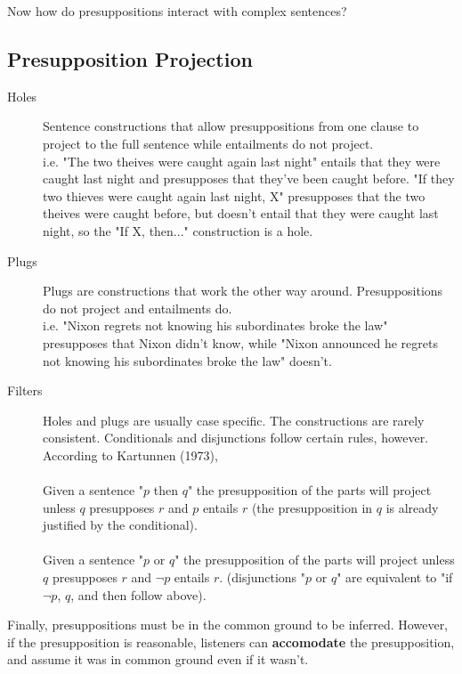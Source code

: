 \documentclass[11pt]{article}
\begin{document}
Now how do presuppositions interact with complex sentences?
\subsection{Presupposition Projection}
\begin{description}
    \item[Holes] Sentence constructions that allow presuppositions from one clause to project to the full
        sentence while entailments do not project. \\
        i.e. "The two theives were caught again last night" entails that they were caught last night and 
        presupposes that they've been caught before. "If they two thieves were caught again last night, X"
        presupposes that the two theives were caught before, but doesn't entail that they were caught 
        last night, so the "If X, then..." construction is a hole.
    \item[Plugs] Plugs are constructions that work the other way around. Presuppositions do not project
        and entailments do.\\
        i.e. "Nixon regrets not knowing his subordinates broke the law" presupposes that Nixon didn't 
        know, while "Nixon announced he regrets not knowing his subordinates broke the law" doesn't.
    \item[Filters] Holes and plugs are usually case specific. The constructions are rarely consistent.
        Conditionals and disjunctions follow certain rules, however. According to Kartunnen (1973),
        \\\\
        Given a sentence "$p$ then $q$" the presupposition of the parts will project unless $q$ 
        presupposes $r$ and $p$ entails $r$ (the presupposition in $q$ is already justified by
        the conditional).
        \\\\
        Given a sentence "$p$ or $q$" the presupposition of the parts will project unless
        $q$ presupposes $r$ and $\neg p$ entails $r$. (disjunctions "$p$ or $q$" are equivalent
        to "if $\neg p$, $q$, and then follow above).
\end{description}

Finally, presuppositions must be in the common ground to be inferred. However, if the presupposition
is reasonable, listeners can \textbf{accomodate} the presupposition, and assume it was in common ground
even if it wasn't.
\end{document}
